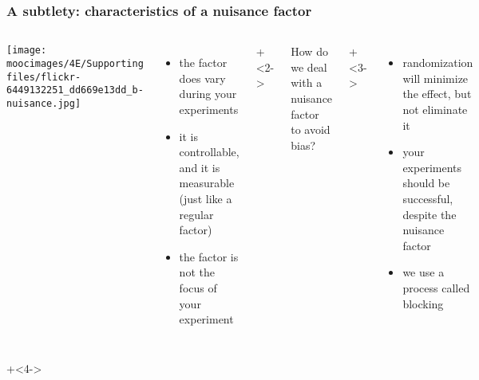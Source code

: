 \documentclass[handout,11pt,aspectratio=169,mathserif]{beamer}
\begin{document}
\begin{frame}\frametitle{A subtlety: characteristics of a nuisance factor}
	\begin{columns}[T]

			\texttt{[image: \\moocimages/4E/Supporting files/flickr-6449132251\_dd669e13dd\_b-nuisance.jpg]}

					
			
		
		\begin{itemize}
			\item	the factor does vary during your experiments
			\item	it is controllable, and it is measurable (just like a regular factor)
			\item	the factor is not the focus of your experiment

		\end{itemize}
		
			\onslide+<2->{
				

				\color{myOrange} How do we deal with a nuisance factor to avoid bias?
			}
			\onslide+<3->{
				\begin{itemize}
					\item	randomization will minimize the effect, but not eliminate it
					\item	your experiments should be successful, despite the nuisance factor
					\item	we use a process called {\color{purple} blocking}
				\end{itemize}
			}			
	\end{columns}
	
	\onslide+<4->{
		\vspace{0.5cm}
		
		\hbox{\hspace{-1.5em}
		}
		
	}
\end{frame}
\end{document}
